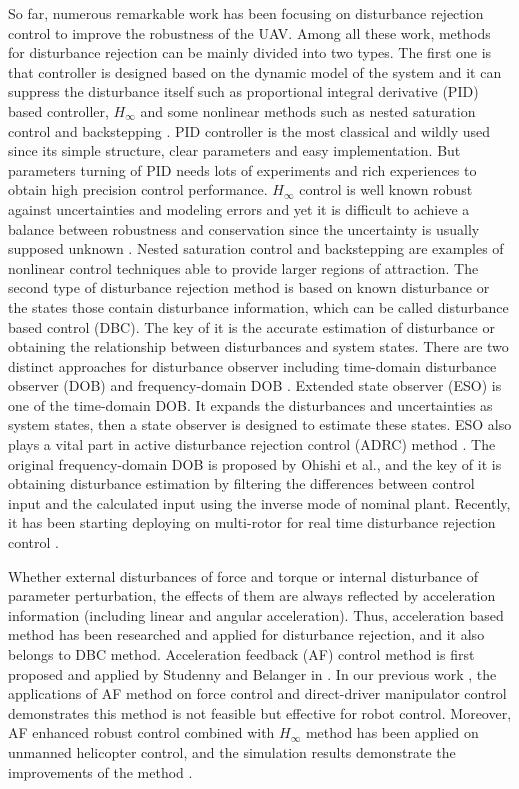 \documentclass[letterpaper, 10 pt, conference]{ieeeconf}  %
\begin{document}
So far, numerous remarkable work has been focusing on disturbance rejection control to improve the robustness of the UAV.
Among all these work, methods for disturbance rejection can be mainly divided into two types.
The first one is that controller is designed based on the dynamic model of the system and it can suppress the disturbance itself such as proportional integral derivative (PID) based controller, $H_{\infty}$ \cite{He2007} and some nonlinear methods such as nested saturation control \cite{Nicotra2014} and backstepping \cite{Madani2006}.
PID controller is the most classical and wildly used since its simple structure, clear parameters and easy implementation. But parameters turning of PID needs lots of experiments and rich experiences to obtain high precision control performance.
$H_{\infty}$ control is well known robust against uncertainties and modeling errors and yet it is difficult to achieve a balance between robustness and conservation since the uncertainty is usually supposed unknown \cite{He2010}.
Nested saturation control and backstepping are examples of nonlinear control techniques able to provide larger regions of attraction.
The second type of disturbance rejection method is based on known disturbance or the states those contain disturbance information, which can be called disturbance based control (DBC).
The key of it is the accurate estimation of disturbance or obtaining the relationship between disturbances and system states.
There are two distinct approaches for disturbance observer including time-domain disturbance observer (DOB) and frequency-domain DOB \cite{Su2016}.
Extended state observer (ESO) is one of the time-domain DOB.
It expands the disturbances and uncertainties as system states, then a state observer is designed to estimate these states.
ESO also plays a vital part in active disturbance rejection control (ADRC) method \cite{Han2009}.
The original frequency-domain DOB is proposed by Ohishi et al.\cite{Ohishi1987}, and the key of it is obtaining disturbance estimation by filtering the differences between control input and the calculated input using the inverse mode of nominal plant.
Recently, it has been starting deploying on multi-rotor for real time disturbance rejection control \cite{Tomic2014}.

Whether external disturbances of force and torque or internal disturbance of parameter perturbation, the effects of them are always reflected by acceleration information (including linear and angular acceleration).
Thus, acceleration based method has been researched and applied for disturbance rejection, and it also belongs to DBC method.
Acceleration feedback (AF) control method is first proposed and applied by Studenny and Belanger in \cite{Studenny1984}. In our previous work \cite{Xu2000,Han2000}, the applications of AF method on force control and direct-driver manipulator control demonstrates this method is not feasible but effective for robot control.
Moreover, AF enhanced robust control combined with $H_{\infty}$ method has been applied on unmanned helicopter control, and the simulation results demonstrate the improvements of the method \cite{He2007,He2010}.
\end{document}
